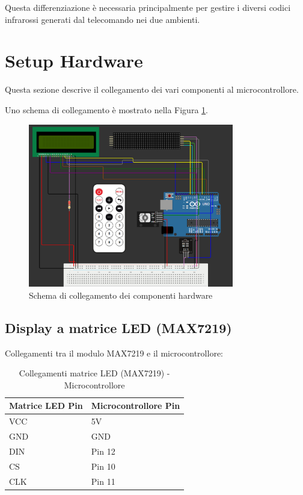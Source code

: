 \documentclass[a4paper, 12pt]{article}
\begin{document}
Questa differenziazione è necessaria principalmente per gestire i diversi codici infrarossi generati dal telecomando nei due ambienti.

\section{Setup Hardware}
\label{sec:setup}
Questa sezione descrive il collegamento dei vari componenti al microcontrollore.

Uno schema di collegamento è mostrato nella Figura \ref{fig:setup-hardware-diagram}.
\begin{figure}[H]
    \centering
    \includegraphics[width=0.8\textwidth]{media/collegamenti.png}
    \caption{Schema di collegamento dei componenti hardware}
    \label{fig:setup-hardware-diagram}
\end{figure}

\subsection{Display a matrice LED (MAX7219)}
\label{subsec:setup-max7219}
Collegamenti tra il modulo MAX7219 e il microcontrollore:

\begin{table}[H]
    \centering
    \caption{Collegamenti matrice LED (MAX7219) - Microcontrollore}
    \label{tab:matrix-max7219-connections}
    \begin{tabular}{ll}
        \toprule
        \textbf{Matrice LED Pin} & \textbf{Microcontrollore Pin} \\
        \midrule
        VCC                 & 5V                            \\
        GND                 & GND                           \\
        DIN                 & Pin 12                        \\
        CS                  & Pin 10                        \\
        CLK                 & Pin 11                        \\
        \bottomrule
    \end{tabular}
\end{table}
\end{document}
